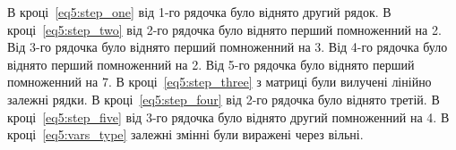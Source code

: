 \documentclass{report}
\begin{document}
В кроці~\eqref{eq5:step_one} від 1-го рядочка було віднято другий рядок.
В кроці~\eqref{eq5:step_two} від 2-го рядочка було віднято перший помноженний на 2. Від 3-го рядочка було віднято перший помноженний на 3. Від 4-го рядочка було віднято перший помноженний на 2. Від 5-го рядочка було віднято перший помноженний на 7.
В кроці~\eqref{eq5:step_three} з матриці були вилучені лінійно залежні рядки.
В кроці~\eqref{eq5:step_four} від 2-го рядочка було віднято третій.
В кроці~\eqref{eq5:step_five} від 3-го рядочка було віднято другий помноженний на 4.
В кроці~\eqref{eq5:vars_type} залежні змінні були виражені через вільні.
\end{document}
